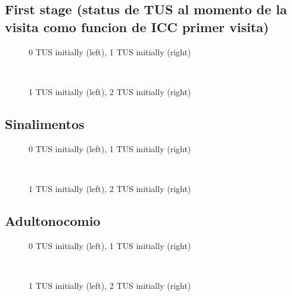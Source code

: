 \documentclass[12pt]{article}
\begin{document}
\subsection{First stage (status de TUS al momento de la visita como funcion de ICC primer visita)}
\begin{figure}[H]%
	\centering
	\caption*{0 TUS initially (left), 1 TUS initially (right)}
	 \quad 
	 \\
	
	\caption*{1 TUS initially (left), 2 TUS initially (right)}
	 \qquad
	\label{fig:hogarzerocobratusTwo}%
\end{figure}

\subsection{Sinalimentos}
\begin{figure}[H]%
	\centering
	\caption*{0 TUS initially (left), 1 TUS initially (right)}
	 \quad 
	 \\
	
	\caption*{1 TUS initially (left), 2 TUS initially (right)}
	 \qquad
	\label{fig:sinalimentosTwo}%
\end{figure}

\subsection{Adultonocomio}
\begin{figure}[H]%
	\centering
	\caption*{0 TUS initially (left), 1 TUS initially (right)}
	 \quad 
	 \\
	
	\caption*{1 TUS initially (left), 2 TUS initially (right)}
	 \qquad
	\label{fig:adultonocomioTwo}%
\end{figure}
\end{document}
